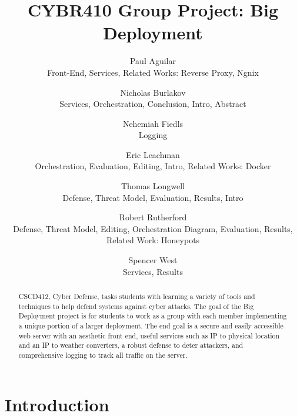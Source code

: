 \documentclass[letterpaper,twocolumn,10pt]{article}
\begin{document}

\date{}

\title{\Large \bf CYBR410 Group Project: Big Deployment}

\author{
  {\rm Paul Aguilar}\\
  \small{Front-End, Services, Related Works: Reverse Proxy, Ngnix}
  \and
  {\rm Nicholas Burlakov}\\
  \small{Services, Orchestration, Conclusion, Intro, Abstract}
  \and
  {\rm Nehemiah Fiedls}\\
  \small{Logging}
  \and
  {\rm Eric Leachman}\\
  \small{Orchestration, Evaluation, Editing, Intro, Related Works: Docker}
  \and
  {\rm Thomas Longwell}\\
  \small{Defense, Threat Model, Evaluation, Results, Intro}
  \and
  {\rm Robert Rutherford}\\
  \small{Defense, Threat Model, Editing, Orchestration Diagram, Evaluation, Results, Related Work: Honeypots}
  \and
  {\rm Spencer West}\\
  \small{Services, Results}
  \and
}

\maketitle

\begin{abstract}
CSCD412, Cyber Defense, tasks students with learning a variety of tools and 
techniques to help defend systems against cyber attacks. The goal of the Big Deployment project is for students to work as a group with each member implementing a unique portion of a larger deployment. The end goal is a secure and easily accessible web server with an aesthetic front end, useful services such as IP to physical location and an IP to weather converters, a robust defense to deter attackers, and comprehensive logging to track all traffic on the server. 
\end{abstract}


\section{Introduction} \label{Introduction}

\end{document}
